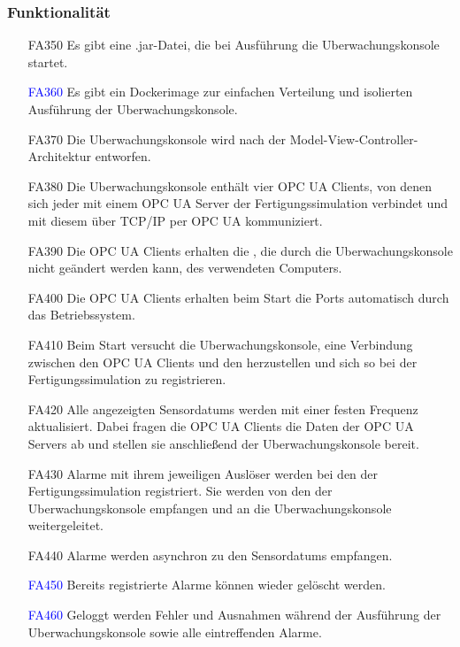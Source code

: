 \documentclass[parskip=full]{scrartcl}
\begin{document}
\subsubsection{Funktionalität}
\begin{enumerate}
  \item[FA350] Es gibt eine .jar-Datei, die bei Ausführung die \gls{Uberwachungskonsole} startet.
  \item[\textcolor{blue}{FA360}] Es gibt ein \gls{Dockerimage} zur einfachen Verteilung und isolierten Ausführung der \gls{Uberwachungskonsole}.
  \item[FA370] Die \gls{Uberwachungskonsole} wird nach der Model-View-Controller-Architektur entworfen.
  \item[FA380] Die \gls{Uberwachungskonsole} enthält vier \glspl{OPC UA Client}, von denen sich jeder mit einem \gls{OPC UA Server} der \gls{Fertigungssimulation} verbindet und mit diesem über \gls{TCP/IP} per
    \gls{OPC  UA} kommuniziert.
  \item[FA390] Die \glspl{OPC UA Client} erhalten die , die durch die \gls{Uberwachungskonsole} nicht geändert werden kann, des verwendeten Computers.
  \item[FA400] Die \glspl{OPC UA Client} erhalten beim Start die Ports automatisch durch das Betriebssystem.
  \item[FA410] Beim Start versucht die \gls{Uberwachungskonsole}, eine Verbindung zwischen den \glspl{OPC UA Client} und den  herzustellen und sich so bei der
    \gls{Fertigungssimulation} zu registrieren.
  \item[FA420] Alle angezeigten \glspl{Sensordatum} werden mit einer festen Frequenz aktualisiert. Dabei fragen die \glspl{OPC UA Client} die Daten der \glspl{OPC UA Server}
    ab und stellen sie anschlie{\ss}end der \gls{Uberwachungskonsole} bereit.
  \item[FA430] Alarme mit ihrem jeweiligen Auslöser werden bei den  der \gls{Fertigungssimulation} registriert. Sie werden von den
     der \gls{Uberwachungskonsole} empfangen und an die \gls{Uberwachungskonsole} weitergeleitet.
  \item[FA440] Alarme werden asynchron zu den \glspl{Sensordatum} empfangen.
  \item[\textcolor{blue}{FA450}] Bereits registrierte Alarme können wieder gelöscht werden.    
  \item[\textcolor{blue}{FA460}] Geloggt werden Fehler und Ausnahmen während der Ausführung der \gls{Uberwachungskonsole} sowie alle eintreffenden Alarme.
\end{enumerate}
\end{document}
